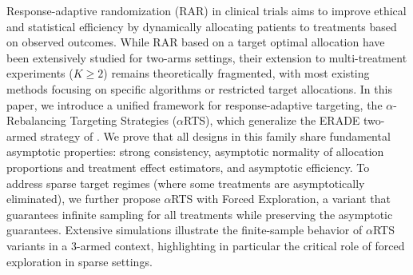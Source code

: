 
Response-adaptive randomization (RAR) in clinical trials aims to improve ethical and statistical efficiency by dynamically allocating patients to treatments based on observed outcomes. While RAR based on a target optimal allocation have been extensively studied for two-arms settings, their extension to multi-treatment experiments ($K \geq 2$) remains theoretically fragmented, with most existing methods focusing on specific algorithms or restricted target allocations.
In this paper, we introduce a unified framework for response-adaptive targeting, the $\alpha$-Rebalancing Targeting Strategies ($\alpha$RTS), which generalize the ERADE two-armed strategy of \cite{hu2009efficient}. We prove that all designs in this family share fundamental asymptotic properties: strong consistency, asymptotic normality of allocation proportions and treatment effect estimators, and asymptotic efficiency. To address sparse target regimes (where some treatments are asymptotically eliminated), we further propose $\alpha$RTS with Forced Exploration, a variant that guarantees infinite sampling for all treatments while preserving the asymptotic guarantees.
Extensive simulations illustrate the finite-sample behavior of $\alpha$RTS variants in a 3-armed context, highlighting in particular the critical role of forced exploration in sparse settings.


%
